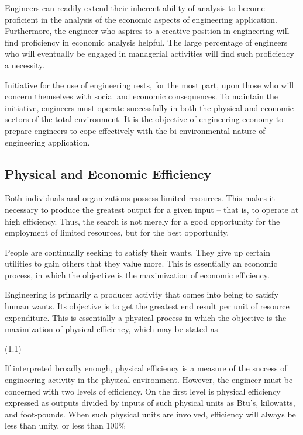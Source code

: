 Engineers can readily extend their inherent ability of analysis to become proficient in the analysis of the economic aspects of engineering application. Furthermore, the engineer who aspires to a creative position in engineering will find proficiency in economic analysis helpful. The large percentage of engineers who will eventually be engaged in managerial activities will find such proficiency a necessity.

Initiative for the use of engineering rests, for the most part, upon those who will concern themselves with social and economic consequences. To maintain the initiative, engineers must operate successfully in both the physical and economic sectors of the total environment. It is the objective of engineering economy to prepare engineers to cope effectively with the bi-environmental nature of engineering application.

\subsection{Physical and Economic Efficiency}

Both individuals and organizations possess limited resources. This makes it necessary to produce the greatest output for a given input – that is, to operate at high efficiency. Thus, the search is not merely for a good opportunity for the employment of limited resources, but for the best opportunity.

People are continually seeking to satisfy their wants. They give up certain utilities to gain others that they value more. This is essentially an economic process, in which the objective is the maximization of economic efficiency.

Engineering is primarily a producer activity that comes into being to satisfy human wants. Its objective is to get the greatest end result per unit of resource expenditure. This is essentially a physical process in which the objective is the maximization of physical efficiency, which may be stated as

				(1.1)

If interpreted broadly enough, physical efficiency is a measure of the success of engineering activity in the physical environment. However, the engineer must be concerned with two levels of efficiency. On the first level is physical efficiency expressed as outputs divided by inputs of such physical units as Btu’s, kilowatts, and foot-pounds. When such physical units are involved, efficiency will always be less than unity, or less than 100\%

